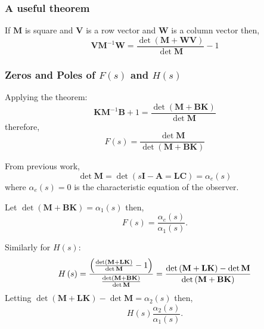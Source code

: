  

\subsubsection*{A useful theorem} %
\label{ssub:a_useful_theorem}

If $\mathbf{M}$ is square and $\mathbf{V}$ is a row vector and $\mathbf{W}$ is a column vector then,
\[
\mathbf{VM}^{-1}\mathbf{W}=\frac{\det\left(\mathbf{M}+\mathbf{WV}\right)}{\det{\mathbf{M}}}-1
\]
 

 
\subsubsection*{Zeros and Poles of $F(s)$ and $H(s)$} %
\label{ssub:zeros_and_poles_of_f_s_and_h_s_}

Applying the theorem:
\[
\mathbf{KM}^{-1}\mathbf{B}+1=\frac{\det\left(\mathbf{M}+\mathbf{BK}\right)}{\det{\mathbf{M}}}
\]
therefore,
\[
F(s) = \frac{\det\mathbf{M}}{\det\left(\mathbf{M}+\mathbf{BK}\right)}
\]

From previous work,
\[
\det\mathbf{M}=\det\left(s\mathbf{I}-\mathbf{A}=\mathbf{LC}\right)=\alpha_e(s)
\]
where $\alpha_e(s)=0$ is the characteristic equation of the observer.

Let $\det\left(\mathbf{M}+\mathbf{BK}\right)=\alpha_1(s)$ then,
\[
F(s)=\frac{\alpha_e(s)}{\alpha_1(s)}.
\]

Similarly for $H(s)$:
\[
H\left( s \right) = \frac{{\left( {\frac{{\det \left( {{\bf{M}} + {\bf{LK}}} \right)}}{{\det {\bf{M}}}} - 1} \right)}}{{\frac{{\det \left( {{\bf{M}} + {\bf{BK}}} \right)}}{{\det {\bf{M}}}}}} = \frac{{\det \left( {{\bf{M}} + {\bf{LK}}} \right) - \det {\bf{M}}}}{{\det \left( {{\bf{M}} + {\bf{BK}}} \right)}}
\]
Letting $\det\left(\mathbf{M}+\mathbf{LK}\right)-\det\mathbf{M}=\alpha_2(s)$ then,
\[
H(s)\frac{\alpha_2(s)}{\alpha_1(s)}.
\]

